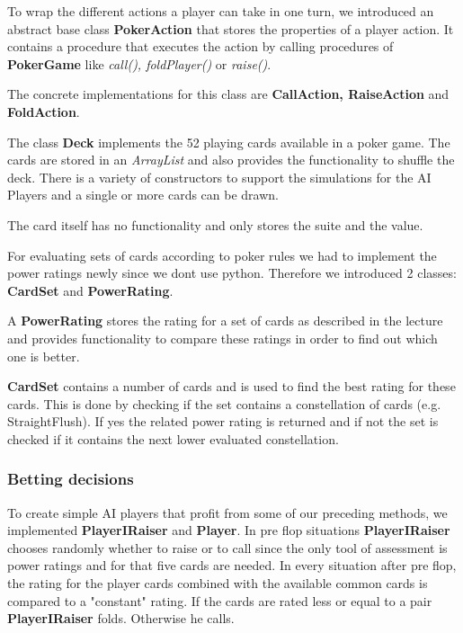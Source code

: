To wrap the different actions a player can take in one turn, we introduced an abstract base class \textbf{PokerAction} that
stores the properties of a player action. It contains a procedure that executes the action by calling procedures of
\textbf{PokerGame} like \textit{call(), foldPlayer()} or \textit{raise()}.

The concrete implementations for this class are \textbf{CallAction, RaiseAction} and \textbf{FoldAction}.

The class \textbf{Deck} implements the 52 playing cards available in a poker game. The cards are stored in an
\textit{ArrayList} and also provides the functionality to shuffle the deck. There is a variety of constructors to
support the simulations for the AI Players and a single or more cards can be drawn.

The card itself has no functionality and only stores the suite and the value.

For evaluating sets of cards according to poker rules we had to implement the power ratings newly since we dont use
python. Therefore we introduced 2 classes: \textbf{CardSet} and \textbf{PowerRating}.

A \textbf{PowerRating} stores the rating for a set of cards as described in the lecture and provides functionality to
compare these ratings in order to find out which one is better.

\textbf{CardSet} contains a number of cards and is used to find the best rating for these cards.
This is done by checking if the set contains a constellation of cards (e.g. StraightFlush). If yes the related power
rating is returned and if not the set is checked if it contains the next lower evaluated constellation.

\subsubsection{Betting decisions}

To create simple AI players that profit from some of our preceding methods, we implemented \textbf{PlayerIRaiser} and
\textbf{Player}. In pre flop situations \textbf{PlayerIRaiser} chooses randomly whether to raise or to call since the
only tool of assessment is power ratings and for that five cards are needed. In every situation after pre flop, the
rating for the player cards combined with the available common cards is compared to a "constant" rating. If the cards
are rated less or equal to a pair \textbf{PlayerIRaiser} folds. Otherwise he calls.

